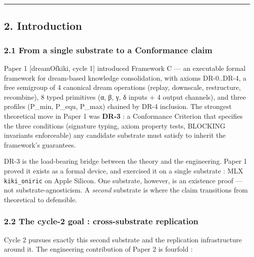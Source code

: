 \documentclass[
]{article}
\begin{document}
\begin{center}\rule{0.5\linewidth}{0.5pt}\end{center}

\subsection{2. Introduction}\label{introduction}

\subsubsection{2.1 From a single substrate to a Conformance
claim}\label{from-a-single-substrate-to-a-conformance-claim}

Paper 1 {[}dreamOfkiki, cycle 1{]} introduced Framework C --- an
executable formal framework for dream-based knowledge consolidation,
with axioms DR-0..DR-4, a free semigroup of 4 canonical dream operations
(replay, downscale, restructure, recombine), 8 typed primitives (α, β,
γ, δ inputs + 4 output channels), and three profiles (P\_min, P\_equ,
P\_max) chained by DR-4 inclusion. The strongest theoretical move in
Paper 1 was \textbf{DR-3} : a Conformance Criterion that specifies the
three conditions (signature typing, axiom property tests, BLOCKING
invariants enforceable) any candidate substrate must satisfy to inherit
the framework's guarantees.

DR-3 is the load-bearing bridge between the theory and the engineering.
Paper 1 proved it exists as a formal device, and exercised it on a
single substrate : MLX \texttt{kiki\_oniric} on Apple Silicon. One
substrate, however, is an existence proof --- not substrate-agnosticism.
A \emph{second} substrate is where the claim transitions from
theoretical to defensible.

\subsubsection{2.2 The cycle-2 goal : cross-substrate
replication}\label{the-cycle-2-goal-cross-substrate-replication}

Cycle 2 pursues exactly this second substrate and the replication
infrastructure around it. The engineering contribution of Paper 2 is
fourfold :
\end{document}
